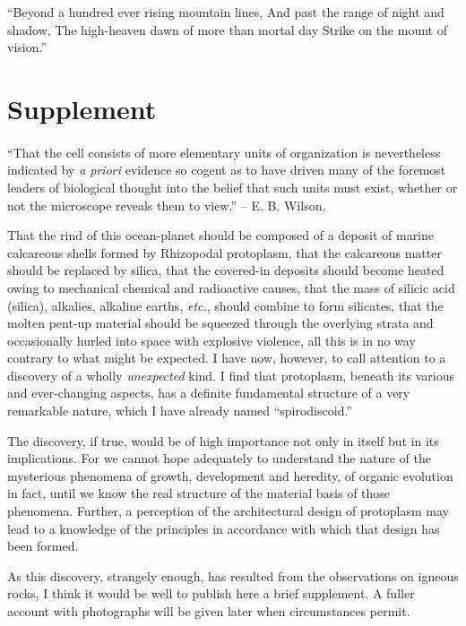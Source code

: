 \documentclass[a4paper, 12pt, oneside]{article}
\begin{document}
``Beyond a hundred ever rising mountain lines,  
And past the range of night and shadow,  
The high-heaven dawn of more than mortal day  
Strike on the mount of vision.''  
\clearpage
\section{Supplement}
\paragraph{}
``That the cell consists of more elementary units of organization is nevertheless indicated by \emph{a priori} evidence so cogent as to have driven many of the foremost leaders of biological thought into the belief that such units must exist, whether or not the microscope reveals them to view.'' -- E. B. Wilson.

That the rind of this ocean-planet should be composed of a deposit of marine calcareous shells formed by Rhizopodal protoplasm, that the calcareous matter should be replaced by silica, that the covered-in deposits should become heated owing to mechanical chemical and radioactive causes, that the mass of silicic acid (silica), alkalies, alkaline earths, \emph{etc.}, should combine to form silicates, that the molten pent-up material should be squeezed through the overlying strata and occasionally hurled into space with explosive violence, all this is in no way contrary to what might be expected. I have now, however, to call attention to a discovery of a wholly \emph{unexpected} kind. I find that protoplasm, beneath its various and ever-changing aspects, has a definite fundamental structure of a very remarkable nature, which I have already named ``spirodiscoid.''

The discovery, if true, would be of high importance not only in itself but in its implications. For we cannot hope adequately to understand the nature of the mysterious phenomena of growth, development and heredity, of organic evolution in fact, until we know the real structure of the material basis of those phenomena. Further, a perception of the architectural design of protoplasm may lead to a knowledge of the principles in accordance with which that design has been formed.

As this discovery, strangely enough, has resulted from the observations on igneous rocks, I think it would be well to publish here a brief supplement. A fuller account with photographs will be given later when circumstances permit.
\end{document}
